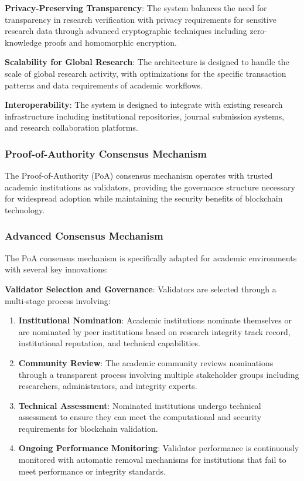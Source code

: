 \documentclass[10pt,twocolumn]{article}
\begin{document}
\textbf{Privacy-Preserving Transparency}: The system balances the need for transparency in research verification with privacy requirements for sensitive research data through advanced cryptographic techniques including zero-knowledge proofs and homomorphic encryption.

\textbf{Scalability for Global Research}: The architecture is designed to handle the scale of global research activity, with optimizations for the specific transaction patterns and data requirements of academic workflows.

\textbf{Interoperability}: The system is designed to integrate with existing research infrastructure including institutional repositories, journal submission systems, and research collaboration platforms.

\subsubsection{Proof-of-Authority Consensus Mechanism}

The Proof-of-Authority (PoA) consensus mechanism operates with trusted academic institutions as validators, providing the governance structure necessary for widespread adoption while maintaining the security benefits of blockchain technology.

\subsubsection{Advanced Consensus Mechanism}

The PoA consensus mechanism is specifically adapted for academic environments with several key innovations:

\textbf{Validator Selection and Governance}: Validators are selected through a multi-stage process involving:

\begin{enumerate}
    \item \textbf{Institutional Nomination}: Academic institutions nominate themselves or are nominated by peer institutions based on research integrity track record, institutional reputation, and technical capabilities.
    
    \item \textbf{Community Review}: The academic community reviews nominations through a transparent process involving multiple stakeholder groups including researchers, administrators, and integrity experts.
    
    \item \textbf{Technical Assessment}: Nominated institutions undergo technical assessment to ensure they can meet the computational and security requirements for blockchain validation.
    
    \item \textbf{Ongoing Performance Monitoring}: Validator performance is continuously monitored with automatic removal mechanisms for institutions that fail to meet performance or integrity standards.
\end{enumerate}
\end{document}
